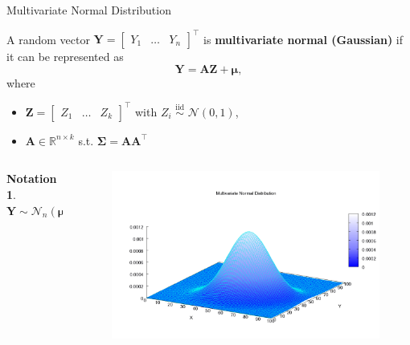 \documentclass{beamer}
\newcommand{\E}{\mathrm{E}}
\newtheorem{notation}{Notation}
\begin{document}
\begin{frame}{Multivariate Normal Distribution}
\begin{definition}
A random vector $\mathbf{Y}=\begin{bmatrix}Y_1 & \ldots & Y_n\end{bmatrix}^\top$ is \textbf{multivariate normal (Gaussian)} if
it can be represented as
$$
\mathbf{Y}=\mathbf{AZ}+\boldsymbol{\mu},
$$
where 
\begin{itemize}
    \item $\mathbf{Z}=\begin{bmatrix}Z_1 & \ldots & Z_k\end{bmatrix}^\top$ with $Z_i\,\,\stackrel{\text{iid}}{\sim}\,\,\mathcal{N}(0, 1)$,
    \item $\mathbf{A}\in\mathbb{R}^{n\times k}$ s.t. $\boldsymbol\Sigma=\mathbf{AA}^\top$%
\end{itemize}
\end{definition}
\pause
\begin{columns}
\begin{column}{.5\textwidth}
\begin{notation}$\mathbf{Y}\sim\mathcal{N}_n(\boldsymbol\mu, \boldsymbol\Sigma)$
\end{notation}
\end{column}
\begin{column}{.5\textwidth}
\pause\begin{figure}
    \centering
    \includegraphics[width=\textwidth]{Multivariate_Gaussian.png}
\end{figure}
\end{column}
\end{columns}
\end{frame}
\end{document}
